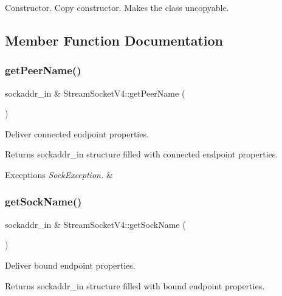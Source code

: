 Constructor. Copy constructor. Makes the class uncopyable. 

\subsection{Member Function Documentation}
\mbox{\label{classStreamSocketV4_ad8ac7763ea0b17c79a9394e22276c2c4}} 
\subsubsection{\texorpdfstring{get\+Peer\+Name()}{getPeerName()}}
{\footnotesize\ttfamily sockaddr\+\_\+in \& Stream\+Socket\+V4\+::get\+Peer\+Name (\begin{DoxyParamCaption}{ }\end{DoxyParamCaption})}

Deliver connected endpoint properties. \begin{DoxyReturn}{Returns}
sockaddr\+\_\+in structure filled with connected endpoint properties. 
\end{DoxyReturn}

\begin{DoxyExceptions}{Exceptions}
{\em Sock\+Exception.} & \\
\hline
\end{DoxyExceptions}
\mbox{\label{classStreamSocketV4_ab5edf2c0cbc8b10784ca067cc64bc454}} 
\subsubsection{\texorpdfstring{get\+Sock\+Name()}{getSockName()}}
{\footnotesize\ttfamily sockaddr\+\_\+in \& Stream\+Socket\+V4\+::get\+Sock\+Name (\begin{DoxyParamCaption}{ }\end{DoxyParamCaption})}

Deliver bound endpoint properties. \begin{DoxyReturn}{Returns}
sockaddr\+\_\+in structure filled with bound endpoint properties. 
\end{DoxyReturn}

